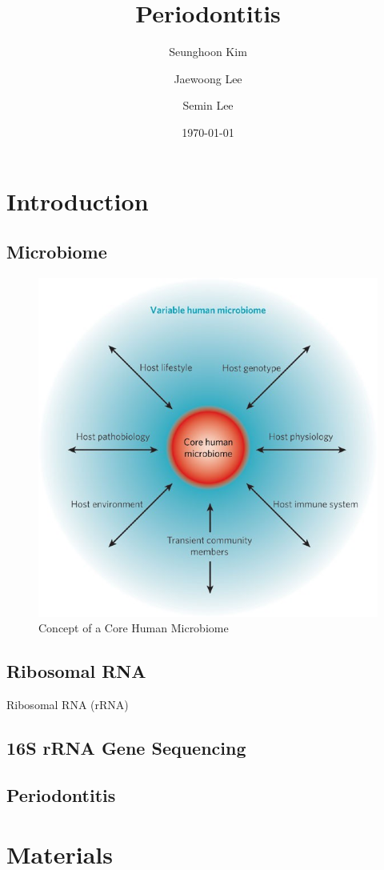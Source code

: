 \documentclass[a4paper]{article}
\title{Periodontitis}
\author{
    Seunghoon Kim
    \and
    Jaewoong Lee
    \and
    Semin Lee
}
\date{\today}
\begin{document}
   	\maketitle
    \newpage

    \tableofcontents
    \listoftables
    \listoffigures
    \newpage

    \section{Introduction}
        \subsection{Microbiome}

            \begin{figure}[p]
                \centering
                \includegraphics[width=0.5 \linewidth]{figures/microbiome.jpg}
                \caption{Concept of a Core Human Microbiome \protect\cite{microbiome1}}
                \label{fig:microbiome-concept}
            \end{figure}

        \subsection{Ribosomal RNA}
            Ribosomal RNA (rRNA)

        \subsection{16S rRNA Gene Sequencing}

        \subsection{Periodontitis}

    \section{Materials}
\end{document}
